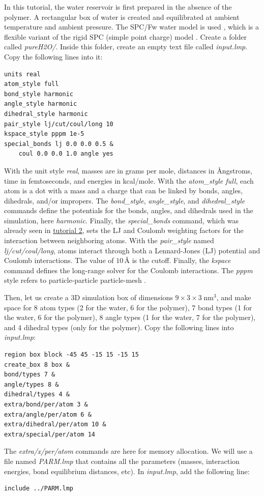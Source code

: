 \documentclass[9pt,tutorial]{livecoms}
\begin{document}
In this tutorial, the water reservoir is first prepared in the absence of the polymer.
A rectangular box of water is created and equilibrated at ambient temperature and
ambient pressure. The SPC/Fw water model is used \cite{wu2006flexible}, which is
a flexible variant of the rigid SPC (simple point charge) model \cite{berendsen1981interaction}.
Create a folder called \textit{pureH2O/}. Inside this folder, create an empty text
file called \textit{input.lmp}. Copy the following lines into it:
{\normalsize \begin{verbatim}
units real
atom_style full
bond_style harmonic
angle_style harmonic
dihedral_style harmonic
pair_style lj/cut/coul/long 10
kspace_style pppm 1e-5
special_bonds lj 0.0 0.0 0.5 &
    coul 0.0 0.0 1.0 angle yes
\end{verbatim}}
With the unit style \textit{real}, masses are in grams per mole, distances in
Ångstroms, time in femtoseconds, and energies in kcal/mole. With the \textit{atom\_style full}, each atom is a dot with a mass and a charge that can be linked by bonds, angles, dihedrals, and/or impropers. The \textit{bond\_style},
\textit{angle\_style}, and \textit{dihedral\_style} commands define the potentials
for the bonds, angles, and dihedrals used in the simulation, here \textit{harmonic}.
Finally, the \textit{special\_bonds} command, which was already seen in
\hyperref[carbon-nanotube-label]{tutorial 2}, sets the LJ and Coulomb weighting
factors for the interaction between neighboring atoms. With the \textit{pair\_style}
named \textit{lj/cut/coul/long}, atoms interact through both a Lennard-Jones (LJ)
potential and Coulomb interactions. The value of $10\,\text{\AA{}}$ is the cutoff.
Finally, the \textit{kspace} command defines the long-range solver for the Coulomb
interactions. The \textit{pppm} style refers to particle-particle particle-mesh \cite{luty1996calculating}.

Then, let us create a 3D simulation box of dimensions $9 \times 3 \times 3 \; \text{nm}^3$,
and make space for 8 atom types (2 for the water, 6 for the polymer), 7 bond types
(1 for the water, 6 for the polymer), 8 angle types (1 for the water, 7 for the polymer),
and 4 dihedral types (only for the polymer). Copy the following lines into \textit{input.lmp}:
{\normalsize \begin{verbatim}
region box block -45 45 -15 15 -15 15
create_box 8 box &
bond/types 7 &
angle/types 8 &
dihedral/types 4 &
extra/bond/per/atom 3 &
extra/angle/per/atom 6 &
extra/dihedral/per/atom 10 &
extra/special/per/atom 14
\end{verbatim}}
The \textit{extra/x/per/atom} commands are here for
memory allocation. We will use a file named \textit{PARM.lmp} that contains
all the parameters (masses, interaction energies, bond equilibrium
distances, etc). In \textit{input.lmp}, add the following line:
{\normalsize \begin{verbatim}
include ../PARM.lmp
\end{verbatim}}
\end{document}
